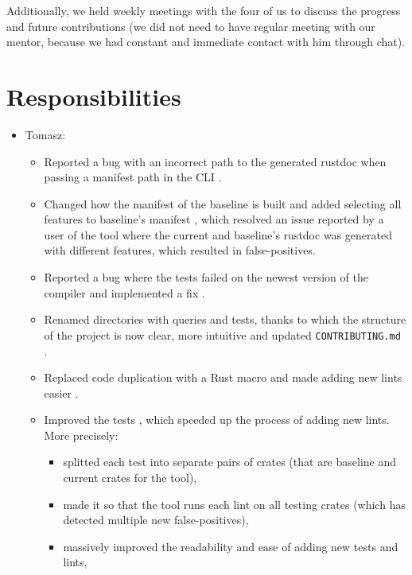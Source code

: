 \documentclass[licencjacka,en]{pracamgr}
\begin{document}
Additionally, we held weekly meetings with the four of us to discuss the progress and future contributions (we did not need to have regular meeting with our mentor, because we had constant and immediate contact with him through chat).

\section{Responsibilities}

\begin{itemize}
	\item Tomasz:
		\begin{itemize}
			\item Reported a bug with an incorrect path to the generated rustdoc when passing
				a manifest path in the CLI \cite{issue_wrong_path_manifest_path}.
			\item Changed how the manifest of the baseline is built and added
				selecting all features to baseline's manifest \cite{pr_changed_how_manifest_baseline_built},
				which resolved an issue reported by a user of the tool
				\cite{issue_baseline_rustdoc_from_registry_default_features}
				where the current and baseline's rustdoc was generated with different features,
				which resulted in false-positives.
			\item Reported a bug where the tests failed on the newest version
				of the compiler \cite{issue_tests_fail_on_nightly}
				and implemented a fix \cite{pr_tests_fail_on_nightly}.
			\item Renamed directories with queries and tests, thanks to which the
				structure of the project is now clear, more intuitive
				\cite{pr_renamed_directories} \cite{pr_renamed_directories_2}
				and updated \texttt{CONTRIBUTING.md} \cite{pr_renamed_directories_3}.
			\item Replaced code duplication with a Rust macro and made adding new
				lints easier \cite{pr_one_macro}.
			\item Improved the tests \cite{pr_split_each_test},
				which speeded up the process of adding new lints.
				More precisely:
				\begin{itemize}
					\item splitted each test into separate pairs of crates
						(that are baseline and current crates for the tool),
					\item made it so that the tool runs each lint on all testing crates
						(which has detected multiple new false-positives),
					\item massively improved the readability and ease of adding new tests and lints,

\end{itemize}
\end{itemize}
\end{itemize}
\end{document}
